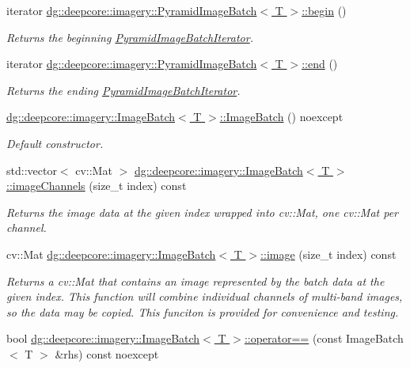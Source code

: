 \begin{DoxyCompactItemize}
iterator \hyperlink{group___imagery_module_ga536737967e4276b646aadc432cce9ca3}{dg\+::deepcore\+::imagery\+::\+Pyramid\+Image\+Batch$<$ T $>$\+::begin} ()
\begin{DoxyCompactList}\small\item\em Returns the beginning \hyperlink{classdg_1_1deepcore_1_1imagery_1_1_pyramid_image_batch_iterator}{Pyramid\+Image\+Batch\+Iterator}. \end{DoxyCompactList}\item 
iterator \hyperlink{group___imagery_module_ga7e2fa7f2608bc1784f52c8f165fcc2f7}{dg\+::deepcore\+::imagery\+::\+Pyramid\+Image\+Batch$<$ T $>$\+::end} ()
\begin{DoxyCompactList}\small\item\em Returns the ending \hyperlink{classdg_1_1deepcore_1_1imagery_1_1_pyramid_image_batch_iterator}{Pyramid\+Image\+Batch\+Iterator}. \end{DoxyCompactList}\item 
\hyperlink{group___imagery_module_ga52149325af21fd8be3bde4c7d78696cd}{dg\+::deepcore\+::imagery\+::\+Image\+Batch$<$ T $>$\+::\+Image\+Batch} () noexcept
\begin{DoxyCompactList}\small\item\em Default constructor. \end{DoxyCompactList}\item 
std\+::vector$<$ cv\+::\+Mat $>$ \hyperlink{group___imagery_module_ga7ccd99a9f9c630c7b732712635684f1f}{dg\+::deepcore\+::imagery\+::\+Image\+Batch$<$ T $>$\+::image\+Channels} (size\+\_\+t index) const 
\begin{DoxyCompactList}\small\item\em Returns the image data at the given index wrapped into cv\+::\+Mat, one cv\+::\+Mat per channel. \end{DoxyCompactList}\item 
cv\+::\+Mat \hyperlink{group___imagery_module_ga73b4b21231657bbb95ab18e4be9f4e19}{dg\+::deepcore\+::imagery\+::\+Image\+Batch$<$ T $>$\+::image} (size\+\_\+t index) const 
\begin{DoxyCompactList}\small\item\em Returns a cv\+::\+Mat that contains an image represented by the batch data at the given index. This function will combine individual channels of multi-\/band images, so the data may be copied. This funciton is provided for convenience and testing. \end{DoxyCompactList}\item 
bool \hyperlink{group___imagery_module_ga6663c2526c7d20915f501b0ac54117be}{dg\+::deepcore\+::imagery\+::\+Image\+Batch$<$ T $>$\+::operator==} (const Image\+Batch$<$ T $>$ \&rhs) const noexcept

\end{DoxyCompactItemize}
